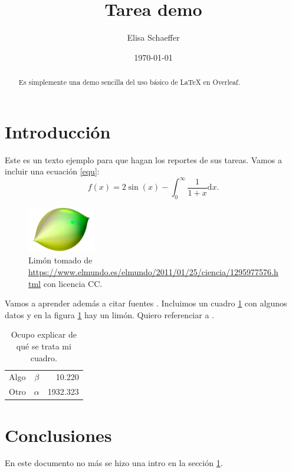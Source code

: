 \documentclass{article}
\author{Elisa Schaeffer} %
\title{Tarea demo} %
\date{\today}
\begin{document}

\maketitle %

\begin{abstract} %
  Es simplemente una demo sencilla del uso b\'{a}sico de \LaTeX{} en
  Overleaf.
\end{abstract}

\section{Introducci\'{o}n}\label{intro} %



Este es un texto ejemplo para que hagan los reportes de sus
tareas. Vamos a incluir una ecuaci\'{o}n \eqref{equ}:
\begin{equation}
  f(x) = 2 \sin(x) - \int_0^\infty \frac{1}{1 + x} \text{d}x.
  \label{equ}
\end{equation}

\begin{figure} %
    \centering
    \includegraphics[width=30mm]{limon.jpg} %
    \caption{Lim\'{o}n tomado de \url{https://www.elmundo.es/elmundo/2011/01/25/ciencia/1295977576.html} con licencia CC.}
    \label{limon}
\end{figure}

\newpage

Vamos a aprender adem\'{a}s a citar fuentes \citep{ejemplo}. Incluimos un
cuadro \ref{datos} con algunos datos y en la figura \ref{limon} hay un
lim\'{o}n. Quiero referenciar a \citet{ejemplo}.

\begin{table} %
    \caption{Ocupo explicar de qu\'{e} se trata mi cuadro.} %
    \label{datos} %
    \centering %
    \begin{tabular}{l|cr} %
         Algo & $\beta$ & 10.220 \\
         Otro & $\alpha$ & 1932.323
    \end{tabular}
\end{table}

\section{Conclusiones}

En este documento no m\'{a}s se hizo una intro en la secci\'{o}n \ref{intro}.



\end{document}
